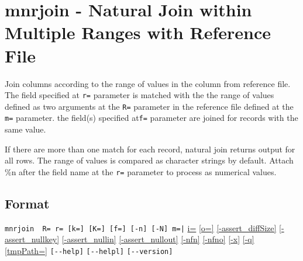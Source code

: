 
%

\section{mnrjoin - Natural Join within Multiple Ranges with Reference File\label{sect:mnrjoin}}
Join columns according to the range of values in the column from reference file. The field specified at \verb|r=| parameter is matched with the the range of values defined as two arguments at the \verb|R=| parameter in the reference file defined at the \verb|m=| parameter. the field(s) specified at\verb|f=| parameter are joined for records with the same value. 

If there are more than one match for each record, natural join returns output for all rows. The range of values is compared as character strings by default. Attach \%n after the field name at the \verb|r=| parameter to process as numerical values.


\subsection*{Format}
\verb/mnrjoin  R= r= [k=] [K=] [f=] [-n] [-N] m=|/ 
\hyperref[sect:option_i]{i=}
\hyperref[sect:option_o]{[o=]}
\hyperref[sect:option_assert_diffSize]{[-assert\_diffSize]}
\hyperref[sect:option_assert_nullkey]{[-assert\_nullkey]}
\hyperref[sect:option_assert_nullin]{[-assert\_nullin]}
\hyperref[sect:option_assert_nullout]{[-assert\_nullout]}
\hyperref[sect:option_nfn]{[-nfn]} 
\hyperref[sect:option_nfno]{[-nfno]}  
\hyperref[sect:option_x]{[-x]}
\hyperref[sect:option_q]{[-q]}
\hyperref[sect:option_option_tmppath]{[tmpPath=]}
\verb|[--help]|
\verb|[--helpl]|
\verb|[--version]|\\

